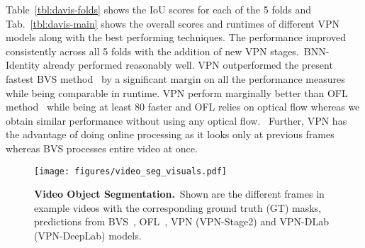\documentclass[10pt,twocolumn,letterpaper]{article}
\newcommand{\mycaption}[2]{\caption{\small \textbf{#1.}~#2}}
\begin{document}
Table~\ref{tbl:davis-folds} shows the IoU scores for each of the 5 folds and
Tab.~\ref{tbl:davis-main} shows the overall scores and runtimes of different VPN
models along with the best performing techniques.
The performance improved consistently across all 5 folds with the addition of new VPN stages.~BNN-Identity already performed reasonably well.
VPN outperformed the present fastest
BVS method~\cite{marki2016bilateral} by a significant margin on all
the performance measures while being comparable in runtime.
VPN perform marginally better than OFL method~\cite{tsaivideo}
while being at least 80 faster and OFL relies on optical flow whereas we
obtain similar performance without using any optical flow.
~Further, VPN has the advantage of doing online processing
as it looks only at previous frames whereas BVS processes entire video at once.

\begin{figure}[th!]
\begin{center}
  \centerline{\texttt{[image: figures/video\_seg\_visuals.pdf]}}
    \mycaption{Video Object Segmentation}
    {Shown are the different frames in example videos with the corresponding
    ground truth (GT) masks, predictions from BVS~\cite{marki2016bilateral},
    OFL~\cite{tsaivideo}, VPN (VPN-Stage2) and VPN-DLab (VPN-DeepLab) models.}
    \label{fig:video_seg_visuals}
\end{center}
\vspace{-1.0cm}
\end{figure}

\vspace{-0.5cm}
\end{document}
